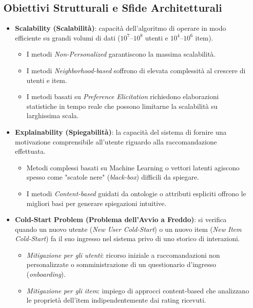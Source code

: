 \subsection{Obiettivi Strutturali e Sfide Architetturali}
\begin{itemize}
    \item \textbf{Scalability (Scalabilità)}: capacità dell'algoritmo di operare in modo efficiente su grandi volumi di dati ($10^7$--$10^8$ utenti e $10^4$--$10^6$ item).
    \begin{itemize}
        \item I metodi \textit{Non-Personalized} garantiscono la massima scalabilità.
        \item I metodi \textit{Neighborhood-based} soffrono di elevata complessità al crescere di utenti e item.
        \item I metodi basati su \textit{Preference Elicitation} richiedono elaborazioni statistiche in tempo reale che possono limitarne la scalabilità su larghissima scala.
    \end{itemize}

    \item \textbf{Explainability (Spiegabilità)}: la capacità del sistema di fornire una motivazione comprensibile all'utente riguardo alla raccomandazione effettuata.
    \begin{itemize}
        \item Metodi complessi basati su Machine Learning o vettori latenti agiscono spesso come "scatole nere" (\textit{black-box}) difficili da spiegare.
        \item I metodi \textit{Content-based} guidati da ontologie o attributi espliciti offrono le migliori basi per generare spiegazioni intuitive.
    \end{itemize}

    \item \textbf{Cold-Start Problem (Problema dell'Avvio a Freddo)}: si verifica quando un nuovo utente (\textit{New User Cold-Start}) o un nuovo item (\textit{New Item Cold-Start}) fa il suo ingresso nel sistema privo di uno storico di interazioni.
    \begin{itemize}
        \item \textit{Mitigazione per gli utenti}: ricorso iniziale a raccomandazioni non personalizzate o somministrazione di un questionario d'ingresso (\textit{onboarding}).
        \item \textit{Mitigazione per gli item}: impiego di approcci content-based che analizzano le proprietà dell'item indipendentemente dai rating ricevuti.
    \end{itemize}
\end{itemize}


